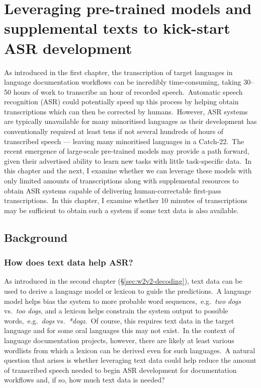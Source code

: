 \documentclass[main.tex]{subfiles}
\begin{document}
\chapter{Leveraging pre-trained models and supplemental texts to kick-start ASR development}

As introduced in the first chapter, the transcription of target languages in language documentation workflows can be incredibly time-consuming, taking 30--50 hours of work to transcribe an hour of recorded speech.~Automatic speech recognition (ASR) could potentially speed up this process by helping obtain transcriptions which can then be corrected by humans.~However, ASR systems are typically unavailable for many minoritised languages as their development has conventionally required at least tens if not several hundreds of hours of transcribed speech --- leaving many minoritised languages in a Catch-22.~The recent emergence of large-scale pre-trained models may provide a path forward, given their advertised ability to learn new tasks with little task-specific data.~In this chapter and the next, I examine whether we can leverage these models with only limited amounts of transcriptions along with supplemental resources to obtain ASR systems capable of delivering human-correctable first-pass transcriptions.~In this chapter, I examine whether 10 minutes of transcriptions may be sufficient to obtain such a system if some text data is also available. 

\section{Background}

\subsection{How does text data help ASR?}

As introduced in the second chapter (§\ref{sec:w2v2-decoding}), text data can be used to derive a language model or lexicon to guide the predictions.~A language model helps bias the system to more probable word sequences,~e.g.~\emph{two dogs} vs.~\emph{too dogs}, and a lexicon helps constrain the system output to possible words,~e.g.~\emph{dogs} vs.~\emph{*dogz}.~Of course, this requires text data in the target language and for some oral languages this may not exist.~In the context of language documentation projects, however, there are likely at least various wordlists from which a lexicon can be derived even for such languages.~A natural question that arises is whether leveraging text data could help reduce the amount of transcribed speech needed to begin ASR development for documentation workflows and, if so, how much text data is needed?
\end{document}
